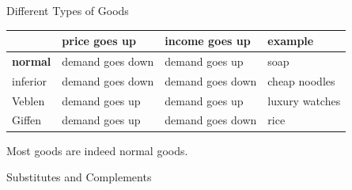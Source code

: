 \begin{frame}{Different Types of Goods}
        \begin{tabular}{llll}
            \toprule
                        & price goes up     & income goes up    & example \\
            \midrule
                        
            \textbf{normal}      & demand goes down  & demand goes up    & soap  \\
            inferior    & demand goes down  & demand goes down  & cheap noodles \\
            Veblen      & demand goes up    & demand goes up    & luxury watches \\
            Giffen      & demand goes up    & demand goes down  & rice \\
            \bottomrule
        \end{tabular}
        
        Most goods are indeed normal goods.
\end{frame}

\begin{frame}{Substitutes and Complements}
\end{frame}


